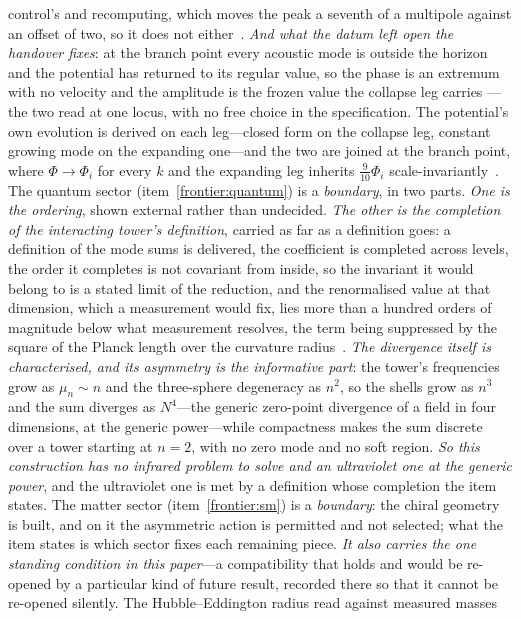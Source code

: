 \documentclass[11pt,a4paper]{article}
\theoremstyle{plain}
\theoremstyle{definition}
\theoremstyle{remark}
\begin{document}
control's and recomputing, which moves the peak a seventh of a multipole against an offset of two, so it does
not either~\cite{JanzenCRcosmology}.  \emph{And what the datum left open the handover fixes}: at the branch
point every acoustic mode is outside the horizon and the potential has returned to its regular value, so the
phase is an extremum with no velocity and the amplitude is the frozen value the collapse leg carries --- the
two read at one locus, with no free choice in the specification.  The potential's own evolution is
derived on each leg---closed form on the collapse leg, constant growing mode on the expanding
one---and the two are joined at the branch point, where $\Phi\to\Phi_i$ for every $k$ and the
expanding leg inherits $\tfrac{9}{10}\Phi_i$ scale-invariantly~\cite{JanzenCRcosmology}.  The quantum sector (item~\ref{frontier:quantum}) is a \emph{boundary}, in two parts.  \emph{One is the ordering},
shown external rather than undecided.  \emph{The other is the completion of the interacting tower's definition},
carried as far as a definition goes: a definition of the mode sums is delivered, the coefficient is completed across
levels, the order it completes is not covariant from inside, so the invariant it would belong to is a stated limit
of the reduction, and the renormalised value at that dimension, which a measurement would fix, lies more than a
hundred orders of magnitude below what measurement resolves, the term being suppressed by the square of the
Planck length over the curvature radius~\cite{JanzenCanonicalTime}.  \emph{The divergence itself is characterised, and its asymmetry is the
informative part}: the tower's frequencies grow as $\mu_n\sim n$ and the
three-sphere degeneracy as $n^{2}$, so the shells grow as $n^{3}$ and the sum diverges as $N^{4}$---the
generic zero-point divergence of a field in four dimensions, at the generic power---while compactness makes
the sum discrete over a tower starting at $n=2$, with no zero mode and no soft region.  \emph{So this
construction has no infrared problem to solve and an ultraviolet one at the generic power}, and the
ultraviolet one is met by a definition whose completion the item states.  The matter sector
(item~\ref{frontier:sm}) is a \emph{boundary}: the chiral geometry is built, and on it the asymmetric action is
permitted and not selected; what the item states is which sector fixes each remaining piece.  \emph{It also carries the one standing condition in this paper}---a
compatibility that holds and would be re-opened by a particular kind of future result, recorded there so
that it cannot be re-opened silently.  The Hubble--Eddington radius read against measured masses
\end{document}

